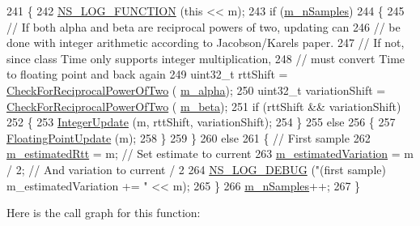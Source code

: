 \begin{DoxyCode}
241 \{
242   \hyperlink{log-macros-disabled_8h_a90b90d5bad1f39cb1b64923ea94c0761}{NS\_LOG\_FUNCTION} (\textcolor{keyword}{this} << m);
243   \textcolor{keywordflow}{if} (\hyperlink{classns3_1_1RttEstimator_a6a70cc48220dae4db259cb5cfee86cf5}{m\_nSamples})
244     \{ 
245       \textcolor{comment}{// If both alpha and beta are reciprocal powers of two, updating can}
246       \textcolor{comment}{// be done with integer arithmetic according to Jacobson/Karels paper.}
247       \textcolor{comment}{// If not, since class Time only supports integer multiplication,}
248       \textcolor{comment}{// must convert Time to floating point and back again}
249       uint32\_t rttShift = \hyperlink{classns3_1_1RttMeanDeviation_a5b8a85f3cdb9d8c9cb438e7f2027bd8f}{CheckForReciprocalPowerOfTwo} (
      \hyperlink{classns3_1_1RttMeanDeviation_abc5474d0966c77bd5ae5631e60c885dd}{m\_alpha});
250       uint32\_t variationShift = \hyperlink{classns3_1_1RttMeanDeviation_a5b8a85f3cdb9d8c9cb438e7f2027bd8f}{CheckForReciprocalPowerOfTwo} (
      \hyperlink{classns3_1_1RttMeanDeviation_a38c17beed105df7cadd05207774f2147}{m\_beta});
251       \textcolor{keywordflow}{if} (rttShift && variationShift)
252         \{
253           \hyperlink{classns3_1_1RttMeanDeviation_af64f76fb0e39c735425f56add7e6bdd0}{IntegerUpdate} (m, rttShift, variationShift);
254         \}
255       \textcolor{keywordflow}{else}
256         \{
257           \hyperlink{classns3_1_1RttMeanDeviation_a6d3dc77a91e8c9aa23d912f2574111db}{FloatingPointUpdate} (m);
258         \}
259     \}
260   \textcolor{keywordflow}{else}
261     \{ \textcolor{comment}{// First sample}
262       \hyperlink{classns3_1_1RttEstimator_ac39ddf21dd9bd99416704b83650d2812}{m\_estimatedRtt} = m;               \textcolor{comment}{// Set estimate to current}
263       \hyperlink{classns3_1_1RttEstimator_a5519242fbbbf189c996e7fd7da2d7085}{m\_estimatedVariation} = m / 2;  \textcolor{comment}{// And variation to current / 2}
264       \hyperlink{group__logging_ga413f1886406d49f59a6a0a89b77b4d0a}{NS\_LOG\_DEBUG} (\textcolor{stringliteral}{"(first sample) m\_estimatedVariation += "} << m);
265     \}
266   \hyperlink{classns3_1_1RttEstimator_a6a70cc48220dae4db259cb5cfee86cf5}{m\_nSamples}++;
267 \}
\end{DoxyCode}


Here is the call graph for this function\+:


